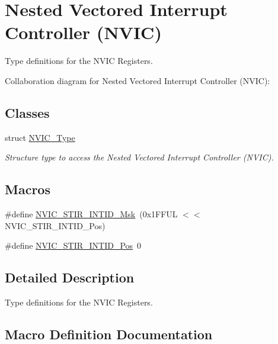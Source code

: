 \hypertarget{group__CMSIS__NVIC}{}\section{Nested Vectored Interrupt Controller (N\+V\+IC)}
\label{group__CMSIS__NVIC}


Type definitions for the N\+V\+IC Registers.  


Collaboration diagram for Nested Vectored Interrupt Controller (N\+V\+IC)\+:
\subsection*{Classes}
\begin{DoxyCompactItemize}
\item 
struct \hyperlink{structNVIC__Type}{N\+V\+I\+C\+\_\+\+Type}
\begin{DoxyCompactList}\small\item\em Structure type to access the Nested Vectored Interrupt Controller (N\+V\+IC). \end{DoxyCompactList}\end{DoxyCompactItemize}
\subsection*{Macros}
\begin{DoxyCompactItemize}
\item 
\#define \hyperlink{group__CMSIS__NVIC_gae4060c4dfcebb08871ca4244176ce752}{N\+V\+I\+C\+\_\+\+S\+T\+I\+R\+\_\+\+I\+N\+T\+I\+D\+\_\+\+Msk}~(0x1\+F\+F\+U\+L $<$$<$ N\+V\+I\+C\+\_\+\+S\+T\+I\+R\+\_\+\+I\+N\+T\+I\+D\+\_\+\+Pos)
\item 
\#define \hyperlink{group__CMSIS__NVIC_ga9eebe495e2e48d302211108837a2b3e8}{N\+V\+I\+C\+\_\+\+S\+T\+I\+R\+\_\+\+I\+N\+T\+I\+D\+\_\+\+Pos}~0
\end{DoxyCompactItemize}


\subsection{Detailed Description}
Type definitions for the N\+V\+IC Registers. 



\subsection{Macro Definition Documentation}
